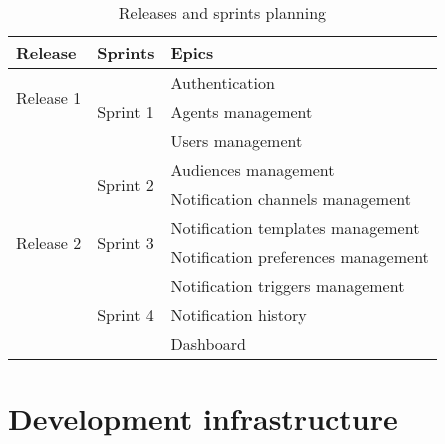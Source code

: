 \begin{table}[hbt!]
      \begin{tabular}{ | m{} | m{} | m{} | }
            \hline
            \textbf{Release}             & \textbf{Sprints}            & \textbf{Epics}                      \\
            \hline
            \multirow{2}{5em}{Release 1}
                                         & \multirow{3}{5em}{Sprint 1} & Authentication                      \\
            \cline{3-3}
                                         &                             & Agents management                   \\
            \cline{3-3}
                                         &                             & Users management                    \\
            \cline{2-3}

                                         & \multirow{2}{5em}{Sprint 2} & Audiences management                \\
            \cline{3-3}
                                         &                             & Notification channels management    \\
            \hline
            \multirow{2}{5em}{Release 2} & \multirow{2}{5em}{Sprint 3} & Notification templates management   \\
            \cline{3-3}
                                         &                             & Notification preferences management \\
            \cline{2-3}
                                         & \multirow{3}{5em}{Sprint 4} & Notification triggers management    \\
            \cline{3-3}
                                         &                             & Notification history                \\
            \cline{3-3}
                                         &                             & Dashboard                           \\
            \hline
      \end{tabular}
      \caption{Releases and sprints planning}
      \label{tab:planning}
\end{table}

\section{Development infrastructure}

